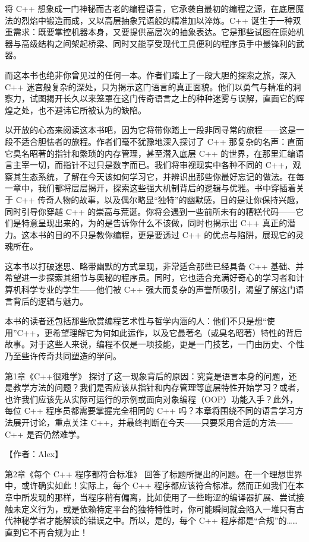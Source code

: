 ﻿将 C++ 想象成一门神秘而古老的编程语言，它承袭自最初的编程之源，在底层魔法的烈焰中锻造而成，又以高层抽象咒语般的精准加以淬炼。C++ 诞生于一种双重需求：既要掌控机器本身，又要提供高层次的抽象表达。它是那些试图在原始机器与高级结构之间架起桥梁、同时又能享受现代工具便利的程序员手中最锋利的武器。

而这本书也绝非你曾见过的任何一本。作者们踏上了一段大胆的探索之旅，深入 C++ 迷宫般复杂的深处，只为揭示这门语言的真正面貌。他们以勇气与精准的洞察力，试图揭开长久以来笼罩在这门传奇语言之上的种种迷雾与误解，直面它的辉煌之处，也不避讳它所被认为的缺陷。

以开放的心态来阅读这本书吧，因为它将带你踏上一段非同寻常的旅程——这是一段不适合胆怯者的旅程。作者们毫不犹豫地深入探讨了 C++ 那复杂的名声：直面它臭名昭著的指针和繁琐的内存管理，甚至潜入底层 C++ 的世界，在那里汇编语言主宰一切，而指针不过只是数字而已。我们将审视现实中各种不同的 C++，观察其生态系统，了解在今天该如何学习它，并辨识出那些你最好忘记的做法。在每一章中，我们都将层层揭开，探索这些强大机制背后的逻辑与优雅。书中穿插着关于 C++ 传奇人物的故事，以及偶尔略显“独特”的幽默感，目的是让你保持兴趣，同时引导你穿越 C++ 的崇高与荒诞。你将会遇到一些前所未有的糟糕代码——它们是特意呈现出来的，为的是告诉你什么不该做，同时也揭示出 C++ 真正的潜力。这本书的目的不只是教你编程，更是要透过 C++ 的优点与陷阱，展现它的灵魂所在。


这本书以打破迷思、略带幽默的方式呈现，非常适合那些已经具备 C++ 基础、并希望进一步探索其细节与奥秘的程序员。同时，它也适合充满好奇心的学习者和计算机科学专业的学生——他们被 C++ 强大而复杂的声誉所吸引，渴望了解这门语言背后的逻辑与魅力。

本书的读者还包括那些欣赏编程艺术性与哲学内涵的人：他们不只是想“使用”C++，更希望理解它为何如此运作，以及它最著名（或臭名昭著）特性的背后故事。对于这些人来说，编程不仅是一项技能，更是一门技艺，一门由历史、个性乃至些许传奇共同塑造的学问。


第1章《C++很难学》 探讨了这一现象背后的原因：究竟是语言本身的问题，还是教学方法的问题？我们是否应该从指针和内存管理等底层特性开始学习？或者，也许我们应该先从实际可运行的示例或面向对象编程（OOP）功能入手？此外，每位 C++ 程序员都需要掌握完全相同的 C++ 吗？本章将围绕不同的语言学习方法展开讨论，重点关注 C++，并最终判断在今天——只要采用合适的方法——C++ 是否仍然难学。

【作者：Alex】

第2章《每个 C++ 程序都符合标准》 回答了标题所提出的问题。在一个理想世界中，或许确实如此！实际上，每个 C++ 程序都应该符合标准。然而正如我们在本章中所发现的那样，当程序稍有偏离，比如使用了一些晦涩的编译器扩展、尝试接触未定义行为，或是依赖特定平台的独特特性时，你可能瞬间就会陷入一堆只有古代神秘学者才能解读的错误之中。所以，是的，每个 C++ 程序都是“合规”的……直到它不再合规为止！


